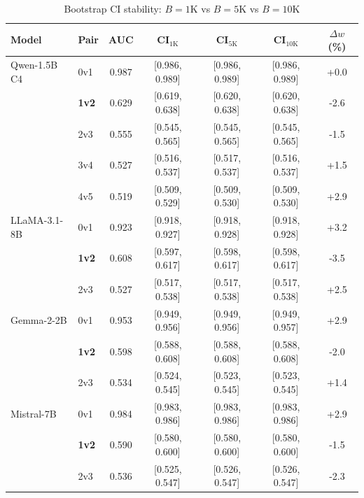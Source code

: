 \begin{table}[t]
\centering
\caption{Bootstrap CI stability: $B{=}1\text{K}$ vs $B{=}5\text{K}$ vs $B{=}10\text{K}$}
\label{tab:bootstrap-stability}
\small
\begin{tabular}{llccccc}
\toprule
Model & Pair & AUC & CI$_{1\text{K}}$ & CI$_{5\text{K}}$ & CI$_{10\text{K}}$ & $\Delta w$ (\%) \\
\midrule
  Qwen-1.5B C4 & 0v1 & 0.987 & [0.986, 0.989] & [0.986, 0.989] & [0.986, 0.989] & +0.0 \\
   & \textbf{1v2} & 0.629 & [0.619, 0.638] & [0.620, 0.638] & [0.620, 0.638] & -2.6 \\
   & 2v3 & 0.555 & [0.545, 0.565] & [0.545, 0.565] & [0.545, 0.565] & -1.5 \\
   & 3v4 & 0.527 & [0.516, 0.537] & [0.517, 0.537] & [0.516, 0.537] & +1.5 \\
   & 4v5 & 0.519 & [0.509, 0.529] & [0.509, 0.530] & [0.509, 0.530] & +2.9 \\
\midrule
  LLaMA-3.1-8B & 0v1 & 0.923 & [0.918, 0.927] & [0.918, 0.928] & [0.918, 0.928] & +3.2 \\
   & \textbf{1v2} & 0.608 & [0.597, 0.617] & [0.598, 0.617] & [0.598, 0.617] & -3.5 \\
   & 2v3 & 0.527 & [0.517, 0.538] & [0.517, 0.538] & [0.517, 0.538] & +2.5 \\
\midrule
  Gemma-2-2B & 0v1 & 0.953 & [0.949, 0.956] & [0.949, 0.956] & [0.949, 0.957] & +2.9 \\
   & \textbf{1v2} & 0.598 & [0.588, 0.608] & [0.588, 0.608] & [0.588, 0.608] & -2.0 \\
   & 2v3 & 0.534 & [0.524, 0.545] & [0.523, 0.545] & [0.523, 0.545] & +1.4 \\
\midrule
  Mistral-7B & 0v1 & 0.984 & [0.983, 0.986] & [0.983, 0.986] & [0.983, 0.986] & +2.9 \\
   & \textbf{1v2} & 0.590 & [0.580, 0.600] & [0.580, 0.600] & [0.580, 0.600] & -1.5 \\
   & 2v3 & 0.536 & [0.525, 0.547] & [0.526, 0.547] & [0.526, 0.547] & -2.3 \\
\bottomrule
\end{tabular}
\end{table}